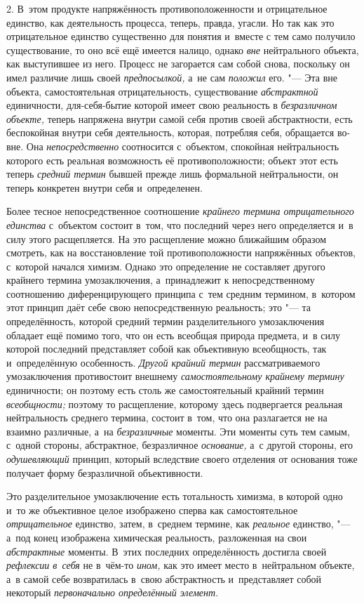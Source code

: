 2. В~этом продукте напряжённость противоположенности и
отрицательное единство, как деятельность процесса, теперь, правда, угасли.
Но так как это отрицательное единство существенно для понятия и~вместе с
тем само получило существование, то оно всё ещё имеется налицо, однако
{\em вне} нейтрального
объекта, как выступившее из него. Процесс не загорается сам собой снова,
поскольку он имел различие лишь своей
{\em предпосылкой,} а~не
сам {\em положил} его. "---
Эта вне объекта, самостоятельная отрицательность,
существование {\em абстрактной}
единичности, для-себя-бытие которой имеет свою реальность в
{\em безразличном объекте,}
теперь напряжена внутри самой себя против своей
абстрактности, есть беспокойная внутри себя деятельность, которая,
потребляя себя, обращается во-вне. Она
{\em непосредственно}
соотносится с~объектом, спокойная нейтральность которого есть
реальная возможность её противоположности; объект этот есть теперь
{\em средний термин}
бывшей прежде лишь формальной нейтральности, он теперь
конкретен внутри себя и~определенен.

Более тесное непосредственное соотношение
{\em крайнего термина отрицательного
единства} с~объектом состоит в~том, что последний через него
определяется и~в силу этого расщепляется. На это расщепление можно
ближайшим образом смотреть, как на восстановление той противоположности
напряжённых объектов, с~которой начался химизм. Однако это определение не
составляет другого крайнего термина умозаключения, а~принадлежит к
непосредственному соотношению диференцирующего принципа с~тем средним
термином, в~котором этот принцип даёт себе свою непосредственную
реальность; это "--- та определённость, которой средний термин
разделительного умозаключения обладает ещё помимо того, что он есть
всеобщая природа предмета, и~в силу которой последний представляет собой
как объективную всеобщность, так и~определённую особенность.
{\em Другой крайний термин}
рассматриваемого умозаключения противостоит внешнему
{\em самостоятельному крайнему термину}
единичности; он поэтому есть столь же самостоятельный крайний
термин {\em всеобщности;}
поэтому то расщепление, которому здесь подвергается реальная
нейтральность среднего термина, состоит в~том, что она разлагается не на
взаимно различные, а~на
{\em безразличные}
моменты. Эти моменты суть тем самым, с~одной стороны,
абстрактное, безразличное
{\em основание,} а~с
другой стороны, его {\em одушевляющий}
принцип, который вследствие своего отделения
от основания тоже получает форму безразличной объективности.

Это разделительное умозаключение есть тотальность химизма, в
которой одно и~то же объективное целое изображено сперва как
самостоятельное {\em отрицательное}
единство, затем, в~среднем термине, как
{\em реальное} единство,
"--- а~под конец изображена химическая реальность, разложенная
на свои {\em абстрактные}
моменты. В~этих последних определённость достигла своей
{\em рефлексии в~себя} не
в~чём-то {\em ином,}
как это имеет место в~нейтральном объекте, а~в самой себе
возвратилась в~свою абстрактность и~представляет собой некоторый
{\em первоначально определённый
элемент}.

